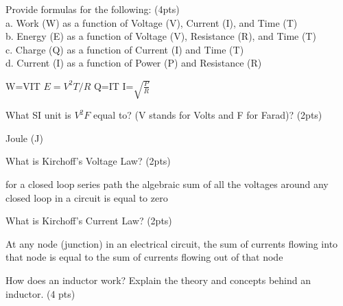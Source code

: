 \documentclass[10pt]{examdesign}
\begin{document}
    \begin{shortanswer}[title={Short Answer},rearrange=no,resetcounter=no]
        \begin{question}
        Provide formulas for the following: (4pts)
        \\a. Work (W) as a function of Voltage (V), Current (I), and Time (T)
        \\b. Energy (E) as a function of Voltage (V), Resistance (R), and Time (T)
        \\c. Charge (Q) as a function of Current (I) and Time (T)
        \\d. Current (I) as a function of Power (P) and Resistance (R)
        
        \begin{answer}
        W=VIT
        $E=V^2 T/R$
        Q=IT
        I=$\sqrt{\frac{P}{R}}$
        \end{answer}
        \end{question}
        \begin{question}
        What SI unit is $V^2F$ equal to? (V stands for Volts and F for Farad)? (2pts)
        \begin{answer}
        Joule (J)
        \end{answer}
        \end{question}
        \begin{question}
        What is Kirchoff's Voltage Law? (2pts)
        \begin{answer}
        for a closed loop series path the algebraic sum of all the voltages around any closed loop in a circuit is equal to zero
        \end{answer}
        \end{question}
        \begin{question}
        What is Kirchoff's Current Law? (2pts)
        \begin{answer}
        At any node (junction) in an electrical circuit, the sum of currents flowing into that node is equal to the sum of currents flowing out of that node
        \end{answer}
        \end{question}
        \begin{question}
        How does an inductor work? Explain the theory and concepts behind an inductor. (4 pts)
        \begin{answer}
        \end{answer}
        \end{question}
        \begin{question}

\end{question}
\end{shortanswer}
\end{document}
